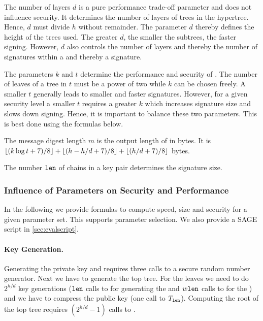 The number of layers $d$ is a pure performance trade-off parameter and does not
influence security. It determines the number of layers of \xmss trees in the
hypertree. Hence, $d$ must divide $h$ without remainder. The parameter $d$
thereby defines the height of the \xmss trees used. The greater $d$, the smaller
the subtrees, the faster signing. However, $d$ also controls the number of
layers and thereby the number of \wotsp signatures within a \hyper and thereby
a \spx signature.

The parameters $k$ and $t$ determine the performance and security of \fors. The
number of leaves of a tree in \fors $t$ must be a power of two while $k$ can be
chosen freely. A smaller $t$ generally leads to smaller and faster signatures.
However, for a given security level a smaller $t$ requires a greater $k$
which increases signature size and slows down signing. Hence, it is important
to balance these two parameters. This is best done using the formulas below.

The message digest length $m$ is the output length of \sphincsHmsg in bytes.
It is $\lfloor(k\log t +7)/ 8\rfloor + \lfloor(h - h/d +7)/ 8\rfloor + \lfloor(h / d +7)/ 8\rfloor$
bytes.

The number $\texttt{len}$ of chains in a \wotsp key pair determines the \wotsp signature size.

\subsubsection{Influence of Parameters on Security and Performance}
\label{sec:generic-estimates}
In the following we provide formulas to compute speed, size and security for
a given \spx parameter set. This supports parameter selection. We also provide
a SAGE script in \autoref{sec:evalscript}.

\paragraph{Key Generation.} Generating the \spx private key and \pseed requires
three calls to a secure random number generator. Next we have to generate the
top tree. For the leaves we need to do $2^{h/d}$ \wotsp key generations ($\texttt{len}$
calls to \sphincsPRF for generating the \sk and $w \texttt{len}$ calls to \sphincsF for the \pk)
and we have to compress the \wotsp public key (one call to $T_\texttt{len}$). Computing
the root of the top tree requires $(2^{h/d} - 1)$ calls to \sphincsH.

